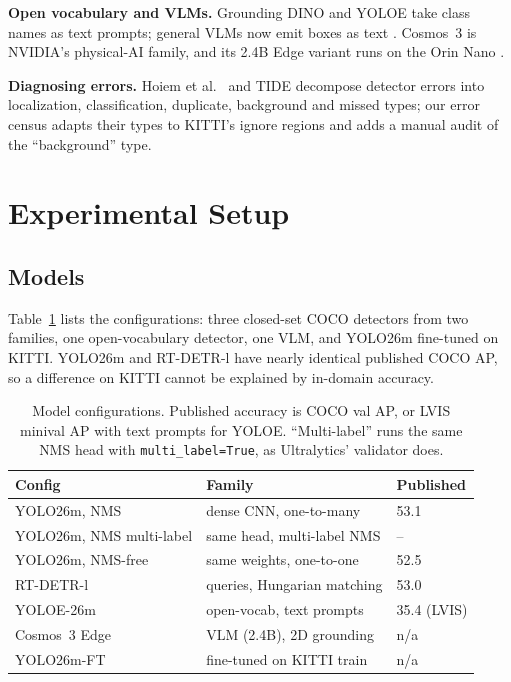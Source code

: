\documentclass[conference]{IEEEtran}
\begin{document}
\textbf{Open vocabulary and VLMs.} Grounding DINO \cite{liu2024groundingdino} and YOLOE \cite{wang2025yoloe} take
class names as text prompts; general VLMs now emit boxes as text \cite{qwen3vl}. Cosmos~3 \cite{nvidia2026cosmos3}
is NVIDIA's physical-AI family, and its 2.4B Edge variant runs on the Orin Nano \cite{cosmos3edge_jetson}.

\textbf{Diagnosing errors.} Hoiem et al.\ \cite{hoiem2012diagnosing} and TIDE \cite{bolya2020tide} decompose
detector errors into localization, classification, duplicate, background and missed types; our error census adapts
their types to KITTI's ignore regions and adds a manual audit of the ``background'' type.

\section{Experimental Setup}
\subsection{Models}
Table~\ref{tab:models} lists the configurations: three closed-set COCO detectors from two families, one
open-vocabulary detector, one VLM, and YOLO26m fine-tuned on KITTI. YOLO26m and RT-DETR-l have nearly identical
published COCO AP, so a difference on KITTI cannot be explained by in-domain accuracy.

\begin{table}[t]
\centering
\caption{Model configurations. Published accuracy is COCO val AP, or LVIS minival AP with text prompts for YOLOE.
``Multi-label'' runs the same NMS head with \texttt{multi\_label=True}, as Ultralytics' validator does.}
\label{tab:models}
\footnotesize
\setlength{\tabcolsep}{4pt}
\begin{tabular}{@{}lll@{}}
\toprule
Config & Family & Published \\
\midrule
YOLO26m, NMS & dense CNN, one-to-many & 53.1 \\
YOLO26m, NMS multi-label & same head, multi-label NMS & -- \\
YOLO26m, NMS-free & same weights, one-to-one & 52.5 \\
RT-DETR-l & queries, Hungarian matching & 53.0 \\
YOLOE-26m & open-vocab, text prompts & 35.4 (LVIS) \\
Cosmos~3 Edge & VLM (2.4B), 2D grounding & n/a \\
YOLO26m-FT & fine-tuned on KITTI train & n/a \\
\bottomrule
\end{tabular}
\end{table}
\end{document}
